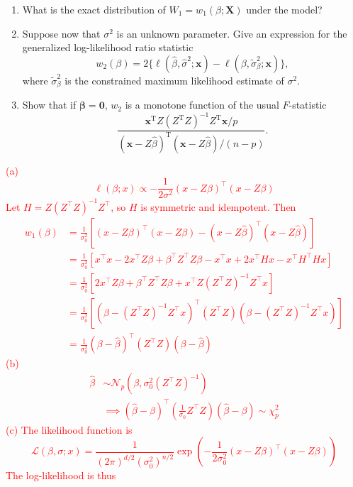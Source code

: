\documentclass[12pt]{article}
\def\T{{ \mathrm{\scriptscriptstyle T} }}
\def\bs#1{{\boldsymbol{#1}}}
\begin{document}
\begin{enumerate}
\begin{enumerate}
\item What is the {exact} distribution of $W_1 = w_1(\beta;\bs X)$ under the model?
\item Suppose now that $\sigma^2$ is an unknown parameter. Give an expression for the generalized log-likelihood ratio statistic 
$$w_2(\beta) = 2\{\ell(\hat\beta,\hat\sigma^2;\bs{x})-\ell(\beta,\tilde\sigma^2_\beta; \bs{x})\},$$  
where $\tilde\sigma^2_\beta$ is the constrained maximum likelihood estimate of $\sigma^2$. 
\item Show that if $\bs\beta = \bs 0$, $w_2$ is a monotone function of the usual $F$-statistic $$\frac{{\bs x^\T}Z(Z^\T Z)^{-1}Z^\T{\bs x}/p}{(\bs x-Z\hat\beta)^\T(\bs x-Z\hat\beta)/(n-p)}.$$
\end{enumerate}
\textcolor{red}{
(a) 
\begin{equation*}
    \ell(\beta ; x) \propto -\frac{1}{2\sigma^2}(x - Z\beta)^\top (x - Z\beta)
\end{equation*}
Let $H = Z(Z^\top Z)^{-1} Z^\top$, so $H$ is symmetric and idempotent. Then 
\begin{align*}
    w_1(\beta) &= \frac{1}{\sigma_0^2}[(x - Z\beta)^\top (x - Z\beta) - (x - Z\hat\beta)^\top (x - Z\hat\beta)]\\
    &= \frac{1}{\sigma_0^2}[x^\top x - 2x^\top Z\beta + \beta^\top Z^\top Z \beta - x^\top x + 2x^\top H x - x^\top H^\top H x]\\
    &= \frac{1}{\sigma_0^2}[2x^\top Z\beta + \beta^\top Z^\top Z \beta + x^\top Z (Z^\top Z)^{-1} Z^\top x]\\
    &= \frac{1}{\sigma_0^2}[(\beta - (Z^\top Z)^{-1} Z^\top x)^\top (Z^\top Z) (\beta - (Z^\top Z)^{-1} Z^\top x)]\\
    &= \frac{1}{\sigma_0^2}(\beta - \hat\beta)^\top (Z^\top Z)(\beta - \hat\beta)
\end{align*}
(b) 
\begin{align*}
    \hat\beta &\sim \mathcal N_p(\beta, \sigma_0^2(Z^\top Z)^{-1}) \\
    &\implies (\hat\beta - \beta)^\top \left(\frac{1}{\sigma_0}Z^\top Z\right)(\hat\beta - \beta) \sim \chi_p^2
\end{align*}
(c) The likelihood function is 
\begin{equation*}
    \mathcal L(\beta, \sigma ; x) = \frac{1}{(2\pi )^{d/2}(\sigma_0^2)^{n/2}}\exp\left(-\frac{1}{2\sigma_0^2}(x - Z\beta)^\top (x - Z\beta)\right)
\end{equation*}
The log-likelihood is thus 
\begin{equation*}

\end{equation*}}
\end{enumerate}
\end{document}
